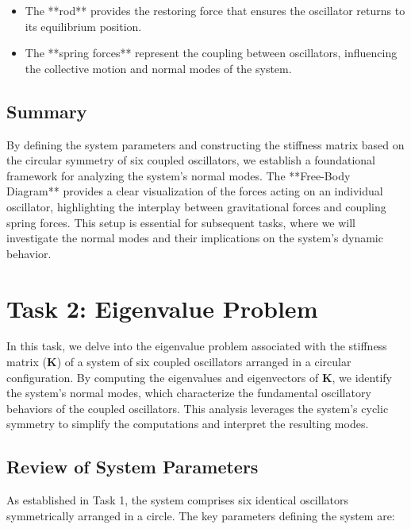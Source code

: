 \documentclass[12pt]{report} %
\begin{document}
    \begin{itemize}
        \item The **rod** provides the restoring force that ensures the oscillator returns to its equilibrium position.
        \item The **spring forces** represent the coupling between oscillators, influencing the collective motion and normal modes of the system.
    \end{itemize}
    
    \subsection{Summary}
    \label{subsec:part2_task1_summary}
    
    By defining the system parameters and constructing the stiffness matrix based on the circular symmetry of six coupled oscillators, we establish a foundational framework for analyzing the system's normal modes. The **Free-Body Diagram** provides a clear visualization of the forces acting on an individual oscillator, highlighting the interplay between gravitational forces and coupling spring forces. This setup is essential for subsequent tasks, where we will investigate the normal modes and their implications on the system's dynamic behavior.
    
    \newpage




\section{Task 2: Eigenvalue Problem}
\label{sec:part2_task2}

In this task, we delve into the eigenvalue problem associated with the stiffness matrix (\( \mathbf{K} \)) of a system of six coupled oscillators arranged in a circular configuration. By computing the eigenvalues and eigenvectors of \( \mathbf{K} \), we identify the system's normal modes, which characterize the fundamental oscillatory behaviors of the coupled oscillators. This analysis leverages the system's cyclic symmetry to simplify the computations and interpret the resulting modes.

\subsection{Review of System Parameters}
\label{subsec:part2_task2_parameters}

As established in Task 1, the system comprises six identical oscillators symmetrically arranged in a circle. The key parameters defining the system are:
\end{document}
